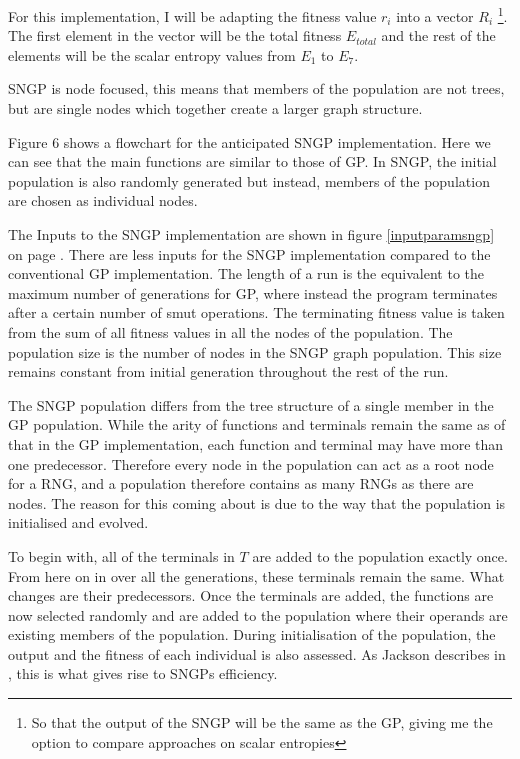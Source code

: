 \documentclass[a4paper,10.5pt]{article}
\begin{document}
For this implementation, I will be adapting the fitness value $r_i$ into a vector $R_i$ \footnote{So that the output of the SNGP will be the same as the GP, giving me the option to compare approaches on scalar entropies}. The first element in the vector will be the total fitness $E_{total}$ and the rest of the elements will be the scalar entropy values from $E_1$ to $E_7$.

SNGP is node focused, this means that members of the population are not trees, but are single nodes which together create a larger graph structure.

Figure 6 shows a flowchart for the anticipated SNGP implementation. Here we can see that the main functions are similar to those of GP.
In SNGP, the initial population is also randomly generated but instead, members of the population are chosen as individual nodes.

The Inputs to the SNGP implementation are shown in figure \ref{inputparamsngp} on page \pageref{inputparamsngp}. There are less inputs for the SNGP implementation compared to the conventional GP implementation. The length of a run is the equivalent to the maximum number of generations for GP, where instead the program terminates after a certain number of smut operations. The terminating fitness value is taken from the sum of all fitness values in all the nodes of the population. The population size is the number of nodes in the SNGP graph population. This size remains constant from initial generation throughout the rest of the run.

The SNGP population differs from the tree structure of a single member in the GP population. While the arity of functions and terminals remain the same as of that in the GP implementation, each function and terminal may have more than one predecessor. Therefore every node in the population can act as a root node for a RNG, and a population therefore contains as many RNGs as there are nodes. The reason for this coming about is due to the way that the population is initialised and evolved.

To begin with, all of the terminals in $T$ are added to the population exactly once. From here on in over all the generations, these terminals remain the same. What changes are their predecessors. Once the terminals are added, the functions are now selected randomly and are added to the population where their operands are existing members of the population. During initialisation of the population, the output and the fitness of each individual is also assessed. As Jackson describes in \cite[p.52]{jacksonsngp2}, this is what gives rise to SNGPs efficiency.
\end{document}

